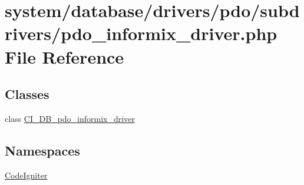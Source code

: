 \hypertarget{pdo__informix__driver_8php}{}\section{system/database/drivers/pdo/subdrivers/pdo\+\_\+informix\+\_\+driver.php File Reference}
\label{pdo__informix__driver_8php}
\subsection*{Classes}
\begin{DoxyCompactItemize}
\item 
class \mbox{\hyperlink{class_c_i___d_b__pdo__informix__driver}{C\+I\+\_\+\+D\+B\+\_\+pdo\+\_\+informix\+\_\+driver}}
\end{DoxyCompactItemize}
\subsection*{Namespaces}
\begin{DoxyCompactItemize}
\item 
 \mbox{\hyperlink{namespace_code_igniter}{Code\+Igniter}}
\end{DoxyCompactItemize}
